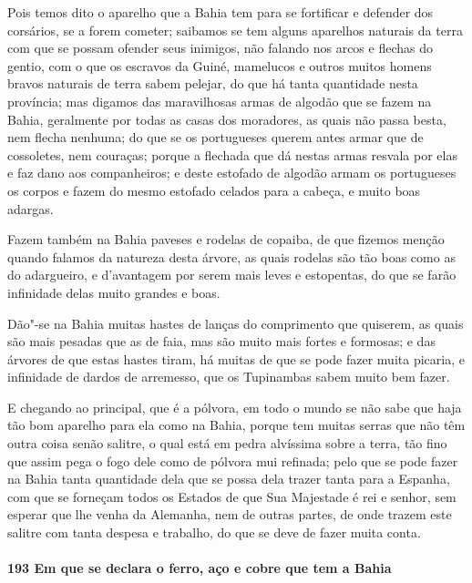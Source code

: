 Pois temos dito o aparelho que a Bahia tem para se fortificar e defender dos corsários, se
a forem cometer; saibamos se tem alguns aparelhos naturais da terra com que se possam
ofender seus inimigos, não falando nos arcos e flechas do gentio, com o que os escravos da
Guiné, mamelucos e outros muitos homens bravos naturais de terra sabem pelejar, do que há
tanta quantidade nesta província; mas digamos das maravilhosas armas de algodão que se
fazem na Bahia, geralmente por todas as casas dos moradores, as quais não passa besta, nem
flecha nenhuma; do que se os portugueses querem antes armar que de cossoletes, nem
couraças; porque a flechada que dá nestas armas resvala por elas e faz dano aos
companheiros; e deste estofado de algodão armam os portugueses os corpos e fazem do mesmo
estofado celados para a cabeça, e muito boas adargas.

Fazem também na Bahia paveses e rodelas de copaiba, de que fizemos menção quando falamos
da natureza desta árvore, as quais rodelas são tão boas como as do adargueiro, e
d'avantagem por serem mais leves e estopentas, do que se farão infinidade delas muito
grandes e boas.

Dão"-se na Bahia muitas hastes de lanças do comprimento que quiserem, as quais são mais
pesadas que as de faia, mas são muito mais fortes e formosas; e das árvores de que estas
hastes tiram, há muitas de que se pode fazer muita picaria, e infinidade de dardos de
arremesso, que os Tupinambas sabem muito bem fazer.

E chegando ao principal, que é a pólvora, em todo o mundo se não sabe que haja tão bom
aparelho para ela como na Bahia, porque tem muitas serras que não têm outra coisa senão
salitre, o qual está em pedra alvíssima sobre a terra, tão fino que assim pega o fogo dele
como de pólvora mui refinada; pelo que se pode fazer na Bahia tanta quantidade dela que se
possa dela trazer tanta para a Espanha, com que se forneçam todos os Estados de que Sua
Majestade é rei e senhor, sem esperar que lhe venha da Alemanha, nem de outras partes, de
onde trazem este salitre com tanta despesa e trabalho, do que se deve de fazer muita
conta.

\paragraph{193 Em que se declara o ferro, aço e cobre que tem a Bahia}

